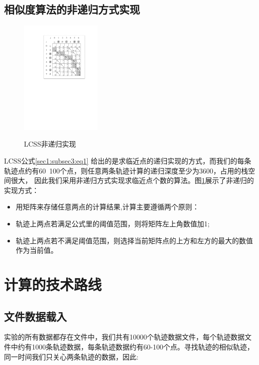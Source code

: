 \documentclass[UTF8]{ctexart}
\begin{document}
\subsection{相似度算法的非递归方式实现}
\label{sec2:subsec3}

\begin{figure}[!htbp]
  \centering
  \includegraphics[width=0.35\textwidth]{fig/fig01.pdf}\\
  \caption{LCSS非递归实现}
  \label{sec2:subsec3:fg1}
\end{figure}

LCSS公式\ref{sec1:subsec3:eq1} 给出的是求临近点的递归实现的方式，而我们的每条轨迹点约有60~100个点，则任意两条轨迹计算的递归深度至少为3600，占用的栈空间很大，
因此我们采用非递归方式实现求临近点个数的算法。图\ref{sec2:subsec3:fg1}展示了非递归的实现方式：

\begin{itemize}
	\item 用矩阵来存储任意两点的计算结果,计算主要遵循两个原则：
	\item 轨迹上两点若满足公式里的阈值范围，则将矩阵左上角数值加1;
	\item 轨迹上两点若不满足阈值范围，则选择当前矩阵点的上方和左方的最大的数值作为当前值。
\end{itemize}

\section{计算的技术路线}\label{sec3}
\subsection{文件数据载入}
实验的所有数据都存在文件中，我们共有10000个轨迹数据文件，每个轨迹数据文件中约有1000条轨迹数据，每条轨迹数据约有60-100个点。寻找轨迹的相似轨迹，同一时间我们只关心两条轨迹的数据，因此:
\end{document}
